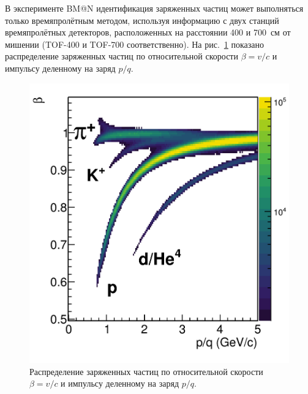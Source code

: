 В эксперименте BM@N идентификация заряженных частиц может выполняться только времяпролётным методом, используя информацию с двух станций времяпролётных детекторов, расположенных на расстоянии 400 и 700~см от мишении (TOF-400 и TOF-700 соответственно).
На рис.~\ref{fig:bmn_beta_pq} показано распределение заряженных частиц по относительной скорости $\beta=v/c$ и импульсу деленному на заряд $p/q$.
%
\begin{figure}[ht]
\begin{center}
\includegraphics[width=0.75\linewidth]{images/beta_pq.png}
\caption{Распределение заряженных частиц по относительной скорости $\beta=v/c$ и импульсу деленному на заряд $p/q$.}
\label{fig:bmn_beta_pq}
\end{center}
\end{figure}



